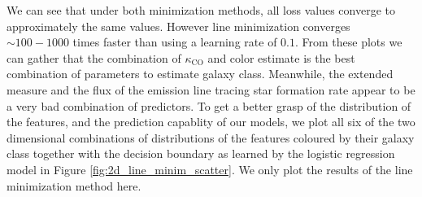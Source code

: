 We can see that under both minimization methods, all loss values converge to approximately the same values. However line minimization converges $\sim 100 - 1000$ times faster than using a learning rate of $0.1$. From these plots we can gather that the combination of $\kappa_{\mathrm{CO}}$ and color estimate is the best combination of parameters to estimate galaxy class. Meanwhile, the extended measure and the flux of the emission line tracing star formation rate appear to be a very bad combination of predictors. To get a better grasp of the distribution of the features, and the prediction capablity of our models, we plot all six of the two dimensional combinations of distributions of the features coloured by their galaxy class together with the decision boundary as learned by the logistic regression model in Figure \ref{fig:2d_line_minim_scatter}. We only plot the results of the line minimization method here.


